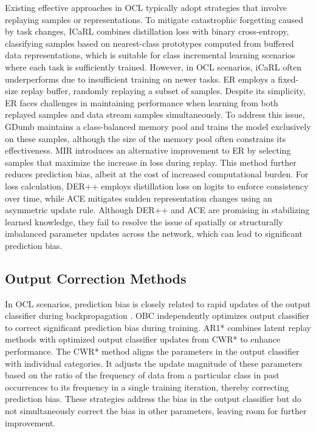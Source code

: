 Existing effective approaches in OCL typically adopt strategies that involve replaying samples or representations. To mitigate catastrophic forgetting caused by task changes, ICaRL \cite{rebuffi2017icarl} combines distillation loss with binary cross-entropy, classifying samples based on nearest-class prototypes computed from buffered data representations, which is suitable for class incremental learning scenarios where each task is sufficiently trained. However, in OCL scenarios, iCaRL often underperforms due to insufficient training on newer tasks. ER \cite{chaudhry2019continual} employs a fixed-size replay buffer, randomly replaying a subset of samples. Despite its simplicity, ER faces challenges in maintaining performance when learning from both replayed samples and data stream samples simultaneously. To address this issue, GDumb \cite{prabhu2020gdumb} maintains a class-balanced memory pool and trains the model exclusively on these samples, although the size of the memory pool often constrains its effectiveness. MIR \cite{aljundi2019online} introduces an alternative improvement to ER by selecting samples that maximize the increase in loss during replay. This method further reduces prediction bias, albeit at the cost of increased computational burden. For loss calculation, DER++ \cite{buzzega2020dark} employs distillation loss on logits to enforce consistency over time, while ACE \cite{caccia2021new} mitigates sudden representation changes using an asymmetric update rule. Although DER++ and ACE are promising in stabilizing learned knowledge, they fail to resolve the issue of spatially or structurally imbalanced parameter updates across the network, which can lead to significant prediction bias. 

\subsection{Output Correction Methods}
In OCL scenarios, prediction bias is closely related to rapid updates of the output classifier during backpropagation \cite{wu2019large}. OBC \cite{chrysakis2023online} independently optimizes output classifier to correct significant prediction bias during training. AR1* \cite{lomonaco2020rehearsal} combines latent replay methods with optimized output classifier updates from CWR* to enhance performance. The CWR* method aligns the parameters in the output classifier with individual categories. It adjusts the update magnitude of these parameters based on the ratio of the frequency of data from a particular class in past occurrences to its frequency in a single training iteration, thereby correcting prediction bias. These strategies address the bias in the output classifier but do not simultaneously correct the bias in other parameters, leaving room for further improvement. 

